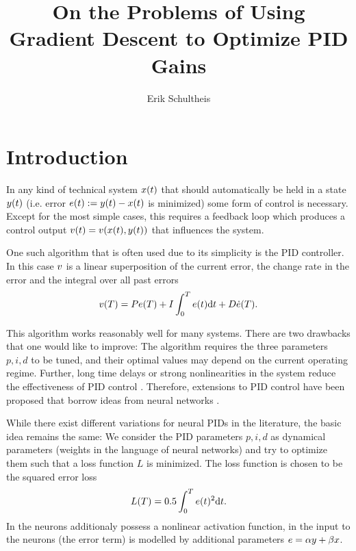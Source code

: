 \documentclass{article}
\begin{document}
  \title{On the Problems of Using Gradient Descent to Optimize PID Gains}
  \author{Erik Schultheis}
  \maketitle

  \clearpage
  \section{Introduction}
    In any kind of technical system $x(t)$ that should automatically 
    be held in a state $y(t)$ (i.e. error $e(t) := y(t) - x(t)$ is minimized) 
    some form of control is necessary. 
    Except for the most simple cases, this requires a feedback loop which produces a 
    control output $v(t) = v(x(t), y(t))$ that influences the system.


    One such algorithm that is often used due to its simplicity is the PID controller. 
    In this case $v$ is a linear superposition of the current error, 
    the change rate in the error and the integral over all past errors
    \begin{align}
        v(T) = P e(T) + I \int_0^T e(t) \mathrm{d}t + D \dot{e}(T). \label{eq:control_equation}
    \end{align}

    This algorithm works reasonably well for many systems.
    There are two drawbacks that one would like to improve: The algorithm requires 
    the three parameters $p, i, d$ to be tuned, and their optimal values may depend 
    on the current operating regime. Further, long time delays or strong nonlinearities in the system reduce the 
    effectiveness of PID control \cite{}.
    Therefore, extensions to PID control have been 
    proposed that borrow ideas from neural networks \cite{cong_novel_2005,yu_applying_2006,shu_pid_2000}.

    While there exist different variations for neural PIDs in the literature, 
    the basic idea remains the same: We consider the PID parameters $p, i, d$ as dynamical parameters 
    (weights in the language of neural networks) and try to optimize them such that a 
    loss function $L$ is minimized. 
    The loss function is chosen to be the squared error loss 
    \begin{align}
        L(T) = 0.5 \int_0^T e(t)^2 \mathrm{d}t. \label{eq:l2loss}
    \end{align}
    In \cite{shu_pid_2000} the neurons additionaly possess a nonlinear activation function, in \cite{} 
    the input to the neurons (the error term) is modelled by additional parameters 
    $e = \alpha y + \beta x$.
\end{document}
